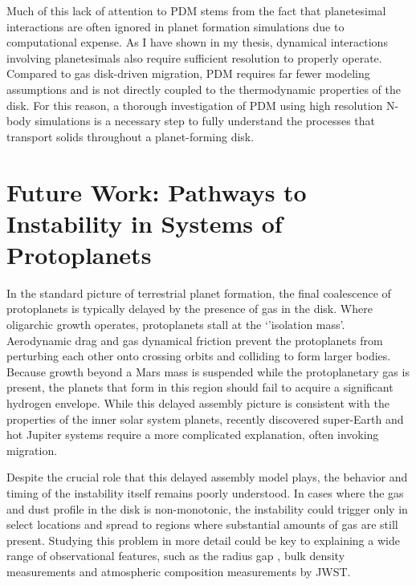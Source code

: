 Much of this lack of attention to PDM stems from the fact that planetesimal interactions are often ignored in planet formation simulations due to computational expense. As I have shown in my thesis, dynamical interactions involving planetesimals also require sufficient resolution to properly operate. Compared to gas disk-driven migration, PDM requires far fewer modeling assumptions and is not directly coupled to the thermodynamic properties of the disk. For this reason, a thorough investigation of PDM using high resolution N-body simulations is a necessary step to fully understand the processes that transport solids throughout a planet-forming disk.

\section{Future Work: Pathways to Instability in Systems of Protoplanets}

In the standard picture of terrestrial planet formation, the final coalescence of protoplanets is typically delayed by the presence of gas in the disk. Where oligarchic growth operates, protoplanets stall at the `'isolation mass'. Aerodynamic drag and gas dynamical friction prevent the protoplanets from perturbing each other onto crossing orbits and colliding to form larger bodies. Because growth beyond a Mars mass is suspended while the protoplanetary gas is present, the planets that form in this region should fail to acquire a significant hydrogen envelope. While this delayed assembly picture is consistent with the properties of the inner solar system planets, recently discovered super-Earth and hot Jupiter systems require a more complicated explanation, often invoking migration.

Despite the crucial role that this delayed assembly model plays, the behavior and timing of the instability itself remains poorly understood. In cases where the gas and dust profile in the disk is non-monotonic, the instability could trigger only in select locations and spread to regions where substantial amounts of gas are still present. Studying this problem in more detail could be key to explaining a wide range of observational features, such as the radius gap \cite{fulton17}, bulk density measurements \cite{lopez14, wolfgang15} and atmospheric composition measurements by JWST.


